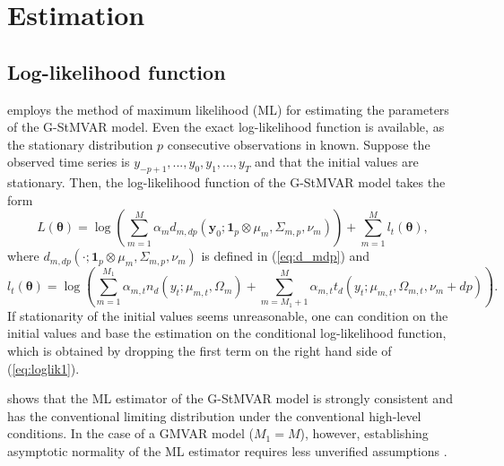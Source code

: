 \documentclass[nojss]{jss}
\begin{document}
\section{Estimation}\label{sec:estimation}

\subsection{Log-likelihood function}\label{sec:loglik}
 employs the method of maximum likelihood (ML) for estimating the parameters of the G-StMVAR model. Even the exact log-likelihood function is available, as the stationary distribution $p$ consecutive observations in known. Suppose the observed time series is $y_{-p+1},...,y_0,y_1,...,y_T$ and that the initial values are stationary.  Then, the log-likelihood function of the G-StMVAR model takes the form
\begin{equation}\label{eq:loglik1}
L(\boldsymbol{\theta})=\log\left(\sum_{m=1}^M\alpha_m d_{m,dp}(\boldsymbol{y}_0;\boldsymbol{1}_p\otimes\mu_m,\Sigma_{m,p},\nu_m) \right) + \sum_{m=1}^M l_t(\boldsymbol{\theta}),
\end{equation}
where $d_{m,dp}(\cdot;\boldsymbol{1}_p\otimes\mu_m,\Sigma_{m,p},\nu_m)$ is defined in (\ref{eq:d_mdp}) and
\begin{equation}\label{eq:loglik2}
l_t(\boldsymbol{\theta}) = \log\left(\sum_{m=1}^{M_1}  \alpha_{m,t}n_d(y_t;\mu_{m,t},\Omega_{m})  + \sum_{m=M_1 + 1}^M  \alpha_{m,t}t_d(y_t;\mu_{m,t},\Omega_{m,t},\nu_m + dp  ) \right).
\end{equation}
If stationarity of the initial values seems unreasonable,  one can condition on the initial values and base the estimation on the conditional log-likelihood function, which is obtained by dropping the first term on the right hand side of (\ref{eq:loglik1}).

\citet[Theorem 3]{Virolainen2:2021} shows that the ML estimator of the G-StMVAR model is strongly consistent and has the conventional limiting distribution under the conventional high-level conditions. In the case of a GMVAR model ($M_1=M$), however, establishing asymptotic normality of the ML estimator requires less unverified assumptions \cite[Theorem 3]{Kalliovirta+Meitz+Saikkonen:2016}.
\end{document}
